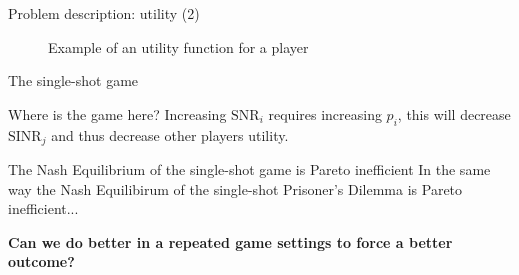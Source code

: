 \begin{frame}{Problem description: utility (2)}
    \begin{figure}
        \centering
        \caption{Example of an utility function for a player}
    \end{figure}
\end{frame}


\begin{frame}{The single-shot game}
    \begin{block}{Where is the game here?}
        Increasing $\text{SNR}_i$ requires increasing $p_i$, this will decrease $\text{SINR}_j$ and
        thus decrease other players utility.
    \end{block}
    \pause 
    \vspace{0.5cm}
    \begin{alertblock}{The Nash Equilibrium of the single-shot game is Pareto inefficient}
        In the same way the Nash Equilibirum of the single-shot Prisoner's Dilemma is
        Pareto inefficient...
    \end{alertblock}
    \pause
    \vspace{0.5cm}
    \textbf{{\color{green}Can we do better in a repeated game settings to force a better outcome?}}
\end{frame}

